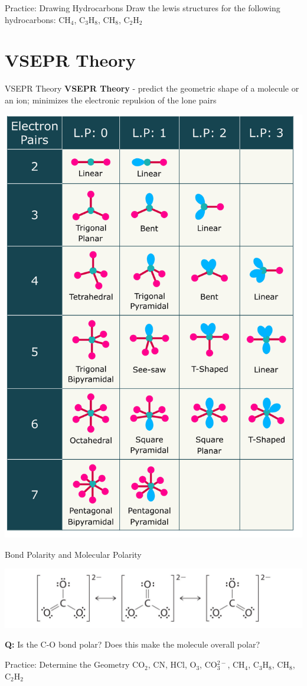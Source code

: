 \documentclass[11pt]{beamer}
\begin{document}
\begin{frame}{Practice: Drawing Hydrocarbons}
  Draw the lewis structures for the following hydrocarbons:
  CH$_4$, C$_3$H$_8$, CH$_8$, C$_2$H$_2$
  \vspace{1.75in}
\end{frame}

\section{VSEPR Theory}

\begin{frame}{VSEPR Theory}
  \textbf{VSEPR Theory} - predict the geometric shape of a
  molecule or an ion; minimizes the electronic repulsion of
  the lone pairs
  
  \centering
  \includegraphics[width=0.6\linewidth,trim={0 12.75in 0in 0},clip]{vsepr_diag}
\end{frame}

\begin{frame}{Bond Polarity and Molecular Polarity}
  \begin{center}
    \includegraphics[width=1\linewidth]{resonance_struct}
  \end{center}

  \textbf{Q:} Is the C-O bond polar? Does this make the molecule
  overall polar?
\end{frame}

\begin{frame}{Practice: Determine the Geometry}
  CO$_2$, CN, HCl, O$_3$, CO$_3^{2-}$,
  CH$_4$, C$_3$H$_8$, CH$_8$, C$_2$H$_2$
  \vspace{1.75in}
\end{frame}
\end{document}
